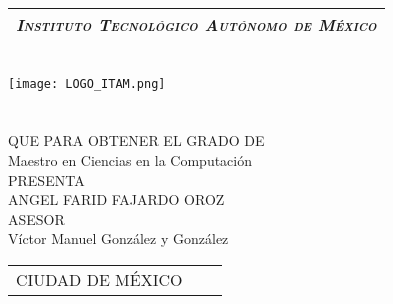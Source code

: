 
\thispagestyle{empty}
\begin{titlepage}

	\begin{center}
	\vspace{70pt}
		\begin{tabular}{c}
			\Large \emph{\textsc{Instituto Tecnológico Autónomo de México}}\\
			\hline
		\end{tabular}\\
		\vspace{25pt}
		\texttt{[image: LOGO\_ITAM.png]}\\
		\vspace{25pt}
		{\huge \thetitle}\\
		\vspace{5pt}
		\vspace{20 pt}
		{\Large \thethesis } \\
		\vspace{5pt}
		QUE PARA OBTENER EL GRADO DE \\
		\vspace{5pt}
		{\Large Maestro en Ciencias en la Computación} \\
		\vspace{5pt}
		PRESENTA \\
		\vspace{5pt}
		{\Large ANGEL FARID FAJARDO OROZ} \\
		\vfill
		ASESOR \\
		{\Large Víctor Manuel González y González} \\
		\vspace{5pt}
		\begin{tabular}{lcr}
			CIUDAD DE MÉXICO & \hspace{60pt} & \theyear
		\end{tabular}
	\end{center}
\end{titlepage}
